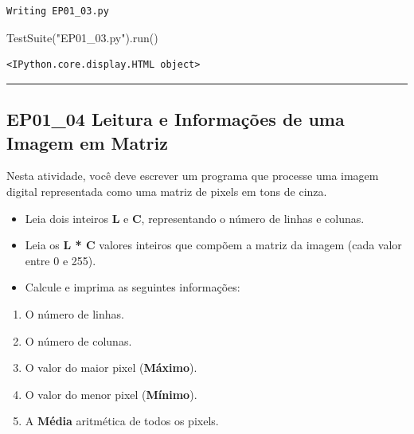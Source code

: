 \documentclass[
  portuguese,
  letterpaper,
  openany,
  oneside,
  12pt,
  a4paper]{book}
\newenvironment{Shaded}{\begin{snugshade}}{\end{snugshade}}
\newcommand{\NormalTok}[1]{\textcolor[rgb]{0.00,0.23,0.31}{#1}}
\newcommand{\StringTok}[1]{\textcolor[rgb]{0.13,0.47,0.30}{#1}}
\providecommand{\tightlist}{%
  \setlength{\itemsep}{0pt}\setlength{\parskip}{0pt}}
\begin{document}
\begin{verbatim}
Writing EP01_03.py
\end{verbatim}

\begin{Shaded}
\begin{Highlighting}[]
\NormalTok{TestSuite(}\StringTok{"EP01\_03.py"}\NormalTok{).run()}
\end{Highlighting}
\end{Shaded}

\begin{verbatim}
<IPython.core.display.HTML object>
\end{verbatim}

\begin{center}\rule{0.5\linewidth}{0.5pt}\end{center}

\subsection{\texorpdfstring{EP01\_04  Leitura e
Informações de uma Imagem em
Matriz}{EP01\_04  Leitura e Informações de uma Imagem em Matriz}}\label{ep01_04-leitura-e-informauxe7uxf5es-de-uma-imagem-em-matriz}

Nesta atividade, você deve escrever um programa que processe uma imagem
digital representada como uma matriz de pixels em tons de cinza.

\begin{itemize}
\tightlist
\item
  Leia dois inteiros \textbf{L} e \textbf{C}, representando o número de
  linhas e colunas.
\item
  Leia os \textbf{L * C} valores inteiros que compõem a matriz da imagem
  (cada valor entre 0 e 255).
\item
  Calcule e imprima as seguintes informações:
\end{itemize}

\begin{enumerate}
\def\labelenumi{\arabic{enumi}.}
\tightlist
\item
  O número de linhas.
\item
  O número de colunas.
\item
  O valor do maior pixel (\textbf{Máximo}).
\item
  O valor do menor pixel (\textbf{Mínimo}).
\item
  A \textbf{Média} aritmética de todos os pixels.
\end{enumerate}
\end{document}
